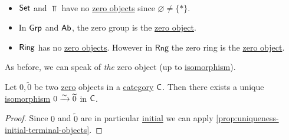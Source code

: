\documentclass[../../main]{subfiles}
\begin{document}
\begin{example}~
  \begin{itemize}
    \item \(\mathsf{Set}\) and \(\Top\) have no \hyperref[def:zero-object]{zero objects} since \(\varnothing \neq \{\ast\}\).
    \item In \(\mathsf{Grp}\) and \(\mathsf{Ab}\), the zero group is the \hyperref[def:zero-object]{zero object}.
    \item \(\mathsf{Ring}\) has no \hyperref[def:zero-object]{zero objects}. However in \(\mathsf{Rng}\) the zero ring is the \hyperref[def:zero-object]{zero object}.
  \end{itemize}
\end{example}

As before, we can speak of \textit{the} zero object (up to \hyperref[def:categorical-isomorphism]{isomorphism}).
\begin{corollary}\label{def:uniqueness-zero-objects}
  Let \(0, \widetilde{0}\) be two \hyperref[def:zero-object]{zero} objects in a \hyperref[def:category]{category} \(\mathsf{C}\).
  Then there exists a unique \hyperref[def:categorical-isomorphism]{isomorphism} \(0 \xrightarrow{\sim} \widetilde{0}\) in \(\mathsf{C}\).
\end{corollary}
\begin{proof}
  Since \(0\) and \(\widetilde{0}\) are in particular \hyperref[def:initial-terminal-object]{initial} we can apply \autoref{prop:uniqueness-initial-terminal-objects}.
\end{proof}
\end{document}
